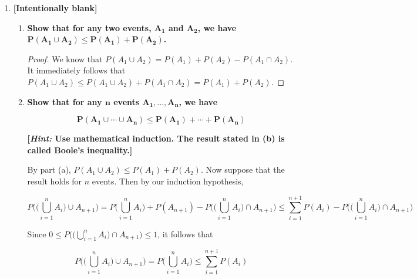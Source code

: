 \documentclass[10pt, oneside]{article}
\begin{document}
\begin{enumerate}[label=1.\arabic*]
\item  \begin{tcolorbox}[
  colback=Cerulean!5!white,
  colframe=Cerulean!75!black]
\textbf{[Intentionally blank]}
\end{tcolorbox}

	\begin{enumerate}
	\item  \begin{tcolorbox}[
	  colback=Cerulean!5!white,
	  colframe=Cerulean!75!black]
	\textbf{Show that for any two events, $\bm{A_1}$ and $\bm{A_2}$, we have $\bm{P(A_1 \cup A_2) \leq P(A_1) + P(A_2)}$.}
	\end{tcolorbox}
	
	\begin{proof} We know that $P(A_1 \cup A_2) = P(A_1) + P(A_2) - P(A_1 \cap A_2)$. It immediately follows that $P(A_1 \cup A_2) \leq P(A_1 \cup A_2) + P(A_1 \cap A_2) = P(A_1) + P(A_2)$. 
	\end{proof}
	
	\item  \begin{tcolorbox}[
	  colback=Cerulean!5!white,
	  colframe=Cerulean!75!black]
	\textbf{Show that for any $\bm{n}$ events $\bm{A_1, ..., A_n}$, we have}
	
	\[ \bm{P(A_1 \cup \cdots \cup A_n) \leq P(A_1) + \cdots + P(A_n)} \]
	
	\textbf{[\textit{Hint:} Use mathematical induction. The result stated in (b) is called Boole's inequality.]}
	\end{tcolorbox}
	
	By part (a), $P(A_1 \cup A_2) \leq P(A_1) + P(A_2)$. Now suppose that the result holds for $n$ events. Then by our induction hypothesis,
	
	\[
	P \bigg( \bigg( \bigcup^n_{i=1} A_i \bigg) \cup A_{n+1} \bigg) = P \bigg( \bigcup^n_{i=1} A_i \bigg) + P (A_{n+1}) - P \bigg( \bigg( \bigcup^n_{i=1} A_i \bigg) \cap A_{n+1} \bigg) \leq \sum^{n+1}_{i=1} P(A_i) - P \bigg( \bigg( \bigcup^n_{i=1} A_i \bigg) \cap A_{n+1} \bigg)
	\]
	
	Since $0 \leq P \big( \big( \bigcup^n_{i=1} A_i \big) \cap A_{n+1} \big) \leq 1$, it follows that
	
	\[ P \bigg( \bigg( \bigcup^n_{i=1} A_i \bigg) \cup A_{n+1} \bigg) = \boxed{P \bigg( \bigcup^n_{i=1} A_i \bigg) \leq \sum^{n+1}_{i=1} P(A_i)} \]
	\end{enumerate}


\end{enumerate}
\end{document}
